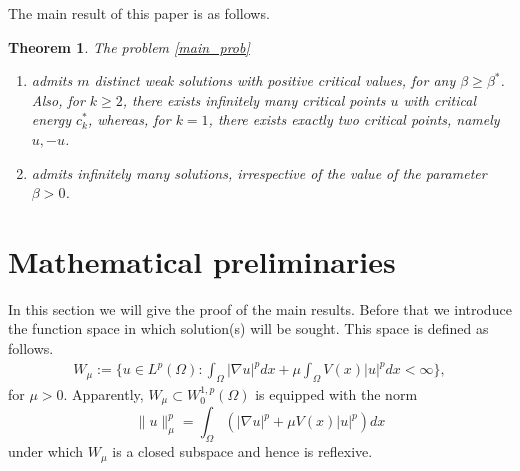 \documentclass[12pt]{extarticle}
\newtheorem{theorem}{Theorem}[section]
\newtheorem{lemma}[theorem]{Lemma}
\theoremstyle{definition}
\theoremstyle{remark}
\theoremstyle{definition}
\numberwithin{equation}{section}
\numberwithin{equation}{section}
\begin{document}
The main result of this paper is as follows.





	
\begin{theorem}\label{main1}
	The problem \eqref{main_prob}
	\begin{enumerate}[label=(\roman*)]
\item admits $m$ distinct weak solutions with positive critical values, for any $\beta \geq\beta^*$.  Also, for $k\geq 2$, there exists infinitely many critical points $u$ with critical energy $c_k^*$, whereas, for $k=1$, there exists exactly two critical points, namely $u,-u$.
\item admits infinitely many solutions, irrespective of the value of the parameter $\beta>0$. 
\end{enumerate}
\end{theorem}

	
	
%	
	\section{Mathematical preliminaries}

	In this section we will give the proof of the main results. Before that we introduce the function space in which solution(s) will be sought. This space is defined as follows.
	\begin{align}\label{SS}
	W_{\mu}:=\{u\in L^{p}(\Omega):\int_{\Omega}|\nabla u|^pdx+\mu\int_{\Omega}V(x)|u|^pdx<\infty\},
	\end{align}
	for $\mu>0$. Apparently, $W_{\mu}\subset W_0^{1,p}(\Omega)$ is equipped with the norm $$\|u\|_{\mu}^p=\int_{\Omega}(|\nabla u|^p+\mu V(x)|u|^p)dx$$ under which $W_{\mu}$ is a closed subspace and hence is reflexive.
	
\end{document}
